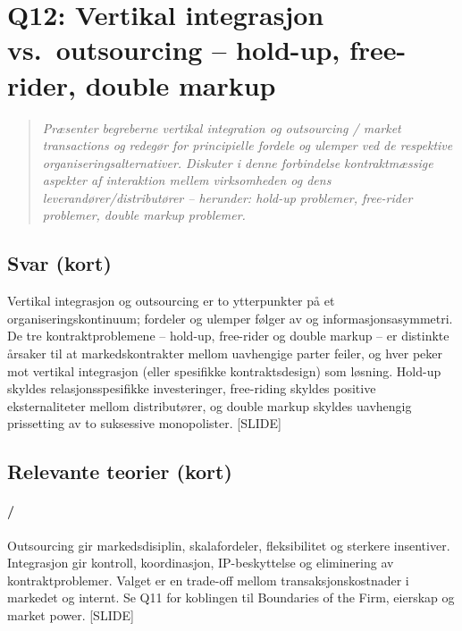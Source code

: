 \section{Q12: Vertikal integrasjon vs.\ outsourcing -- hold-up, free-rider, double markup}\label{q:12}

\begin{quote}
\emph{Præsenter begreberne vertikal integration og outsourcing / market transactions og redegør for principielle fordele og ulemper ved de respektive organiseringsalternativer. Diskuter i denne forbindelse kontraktmæssige aspekter af interaktion mellem virksomheden og dens leverandører/distributører -- herunder: hold-up problemer, free-rider problemer, double markup problemer.}
\end{quote}

\subsection*{Svar (kort)}
Vertikal integrasjon og outsourcing er to ytterpunkter på et organiseringskontinuum; fordeler og ulemper følger av  og informasjonsasymmetri. De tre kontraktproblemene -- hold-up, free-rider og double markup -- er distinkte årsaker til at markedskontrakter mellom uavhengige parter feiler, og hver peker mot vertikal integrasjon (eller spesifikke kontraktsdesign) som løsning. Hold-up skyldes relasjonsspesifikke investeringer, free-riding skyldes positive eksternaliteter mellom distributører, og double markup skyldes uavhengig prissetting av to suksessive monopolister. [SLIDE]

\subsection*{Relevante teorier (kort)}

\paragraph{\quad\SOne/\SThree}
Outsourcing gir markedsdisiplin, skalafordeler, fleksibilitet og sterkere insentiver. Integrasjon gir kontroll, koordinasjon, IP-beskyttelse og eliminering av kontraktproblemer. Valget er en trade-off mellom transaksjonskostnader i markedet og  internt. Se Q11 for koblingen til Boundaries of the Firm, eierskap og market power. [SLIDE]

